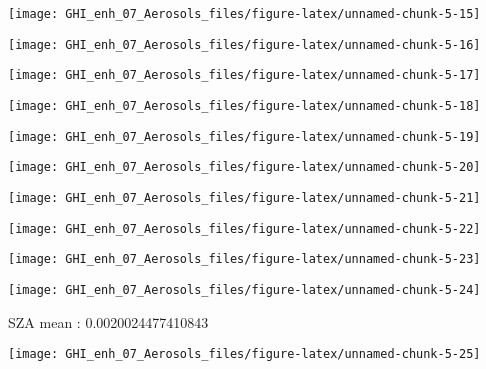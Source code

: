 \documentclass[
  10pt,
  a4paper,oneside]{article}
\begin{document}
\begin{center}\texttt{[image: GHI\_enh\_07\_Aerosols\_files/figure-latex/unnamed-chunk-5-15]} \end{center}

\begin{center}\texttt{[image: GHI\_enh\_07\_Aerosols\_files/figure-latex/unnamed-chunk-5-16]} \end{center}

\begin{center}\texttt{[image: GHI\_enh\_07\_Aerosols\_files/figure-latex/unnamed-chunk-5-17]} \end{center}

\begin{center}\texttt{[image: GHI\_enh\_07\_Aerosols\_files/figure-latex/unnamed-chunk-5-18]} \end{center}

\begin{center}\texttt{[image: GHI\_enh\_07\_Aerosols\_files/figure-latex/unnamed-chunk-5-19]} \end{center}

\begin{center}\texttt{[image: GHI\_enh\_07\_Aerosols\_files/figure-latex/unnamed-chunk-5-20]} \end{center}

\begin{center}\texttt{[image: GHI\_enh\_07\_Aerosols\_files/figure-latex/unnamed-chunk-5-21]} \end{center}

\begin{center}\texttt{[image: GHI\_enh\_07\_Aerosols\_files/figure-latex/unnamed-chunk-5-22]} \end{center}

\begin{center}\texttt{[image: GHI\_enh\_07\_Aerosols\_files/figure-latex/unnamed-chunk-5-23]} \end{center}

\begin{center}\texttt{[image: GHI\_enh\_07\_Aerosols\_files/figure-latex/unnamed-chunk-5-24]} \end{center}

SZA mean : 0.0020024477410843

\begin{center}\texttt{[image: GHI\_enh\_07\_Aerosols\_files/figure-latex/unnamed-chunk-5-25]} \end{center}
\end{document}
